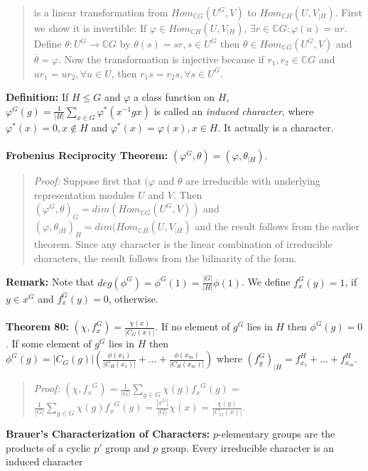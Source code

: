 {\begin{quote}
is a linear transformation from
$ Hom_{{\mathbb C}G}(U^G, V)$ to $Hom_{{\mathbb C}H}(U, V_{|H})$.  First we show it
is invertible: 
If $\varphi \in Hom_{{\mathbb C}H}(U, V_{|H})$,
$\exists r \in {\mathbb C}G: \varphi(u)= ur$.  Define $\theta: U^G \rightarrow {\mathbb C}G$
by $\theta(s)= sr, s \in U^G$ then
$\theta \in Hom_{{\mathbb C}G}(U^G, V) $ and ${\overline \theta}= \varphi$.  Now
the transformation is injective because if
$r_1 , r_2 \in {\mathbb C}G$ and  $u r_1 = u r_2, \forall u \in U$, then
$r_1 s = r_2 s, \forall s \in U^G$.
\end{quote}
{\bf Definition:}
If $H \le G$ and $\varphi$ a class function on $H$, 
$\varphi^G(g)= {\frac 1 {|H|}} \sum_{x \in G} \varphi^* (x^{-1}gx)$ is called an
\emph{induced character}, where $\varphi^*(x)= 0, x \notin H$ and
$\varphi^*(x)= \varphi(x), x \in H$.  It actually is a character.
\\
\\
{\bf Frobenius Reciprocity Theorem:} 
$(\varphi^G , \theta)= (\varphi, \theta_{|H})$.
\begin{quote}
\emph{Proof:}  
Suppose first that 
$(\varphi$ and $\theta$ are irreducible with underlying representation modules
$U$ and $V$.  Then
$(\varphi^G , \theta)_G = dim(Hom_{{\mathbb C}G}(U^G, V))$ and
$(\varphi , \theta_{|H})_H = dim(Hom_{{\mathbb C}H}(U, V_{|H})$ and the result follows from
the earlier theorem.  Since any character is the linear combination of irreducible characters,
the result follows from the bilinarity of the form.
\end{quote}
{\bf Remark:}  Note that $deg(\phi^G)= \phi^G(1)= {\frac {|G|} {|H|}} \phi(1)$.
We define  $f^G_x(y) = 1$, if $y \in x^G$ and
$f^G_x(y) = 0$, otherwise.
\\
\\
{\bf Theorem 80:}
$(\chi, f^G_x) = {\frac {\chi(x)} {|C_G(x)|}}$.
If no element of $g^G$ lies in $H$ then $\phi^G(g)= 0$.
If some element of $g^G$ lies in $H$ then 
$\phi^G(g)= 
|C_G(g)|(
{\frac {\phi(x_1 )} {|C_H(x_1)|}} + \ldots +
{\frac {\phi(x_m )} {|C_H(x_m)|}} ) $ where $(f^G_g)_{|H}= 
f^H_{x_1} + \ldots +
f^H_{x_m}$.
\begin{quote}
\emph{Proof:}  
$(\chi , {f_x}^G) = {\frac 1 {|G|}} \sum_{g \in G} \chi(g) {f_x}^G(g)= $
${\frac 1 {|G|}} \sum_{g \in G} \chi(g) {f_x}^G(g)= {\frac {|x^G|} {|G|}} \chi(x) = {\frac {\chi(g)} {|C_G(x)|}}$.
\end{quote}
{\bf Brauer's Characterization of Characters:} $p$-elementary groups are the products of
a cyclic $p'$ group and $p$ group.  Every irreducible character is an induced character
}
